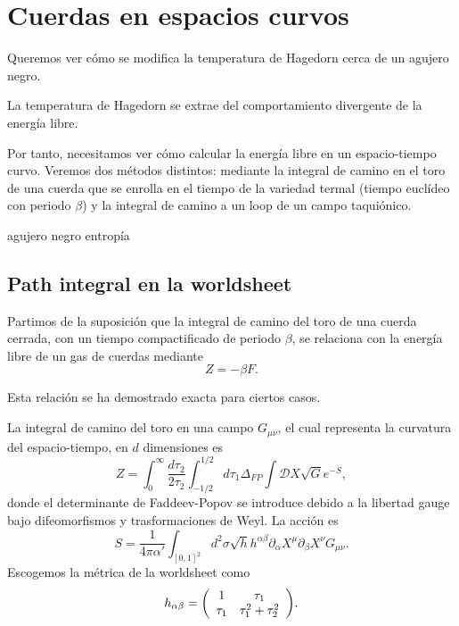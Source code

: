 \chapter{Cuerdas en espacios curvos}

Queremos ver cómo se modifica la temperatura de Hagedorn cerca de un agujero negro.

La temperatura de Hagedorn se extrae del comportamiento divergente de la energía libre.


Por tanto, necesitamos ver cómo calcular la energía libre en un espacio-tiempo curvo.
Veremos dos métodos distintos: mediante la integral de camino en el toro de una cuerda
que se enrolla en el tiempo de la variedad termal (tiempo euclídeo con periodo $\beta$) y
la integral de camino a un loop de un campo taquiónico.

agujero negro entropía

\section{Path integral en la worldsheet}

Partimos de la suposición que la integral de camino del toro de una cuerda cerrada, con
un tiempo compactificado de periodo $\beta$, se relaciona con la energía libre de un gas de cuerdas mediante
\begin{equation}
  Z =  -\beta F.
\end{equation}

Esta relación se ha demostrado exacta para ciertos casos.

La integral de camino del toro en una campo $G_{\mu\nu}$, el cual representa la curvatura
del espacio-tiempo, en $d$ dimensiones es
\begin{equation}
  Z=\int_0^\infty \frac{d\tau_2}{2\tau_2} \int_{-1/2}^{1/2} d\tau_1 \Delta_{FP} \int \mathcal DX
  \sqrt G e^{-S},
  \label{eq:toruspi}
\end{equation}
donde el determinante de Faddeev-Popov se introduce debido a la libertad gauge bajo difeomorfismos
y trasformaciones de Weyl.
La acción es 
\begin{equation}
  S= \frac{1}{4\pi \alpha'}\int_{[0,1]^2} d^2\sigma \sqrt h h^{\alpha\beta} \partial_\alpha X^\mu\partial_\beta X^\nu G_{\mu\nu}.
\end{equation}
Escogemos la métrica de la worldsheet como
\begin{equation}
  h_{\alpha\beta} =
\qty(
\begin{array}{cc}
  1 & \tau_1 \\
  \tau_1 & \tau_1^2+\tau_2^2
\end{array}
).
\end{equation}

